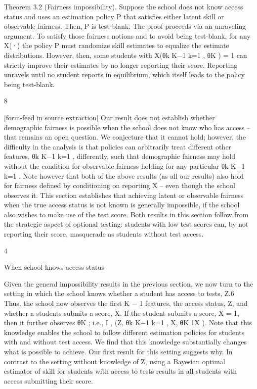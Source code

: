 \documentclass[10pt]{article}
\begin{document}
\begin{ReviewVerbatim}
Theorem 3.2 (Fairness impossibility). Suppose the school does not know access status and uses an
estimation policy P that satisfies either latent skill or observable fairness. Then, P is test-blank.
The proof proceeds via an unraveling argument. To satisfy those fairness notions and to avoid
being test-blank, for any X(·) the policy P must randomize skill estimates to equalize the estimate distributions. However, then, some students with X({θk }K−1
k=1 , θK ) = 1 can strictly improve
their estimates by no longer reporting their score. Reporting unravels until no student reports in
equilibrium, which itself leads to the policy being test-blank.

8


[form-feed in source extraction]
Our result does not establish whether demographic fairness is possible when the school does not
know who has access – that remains an open question. We conjecture that it cannot hold; however,
the diﬃculty in the analysis is that policies can arbitrarily treat diﬀerent other features, {θk }K−1
k=1 ,
diﬀerently, such that demographic fairness may hold without the condition for observable fairness
holding for any particular {θk }K−1
k=1 . Note however that both of the above results (as all our results)
also hold for fairness deﬁned by conditioning on reporting X – even though the school observes it.
This section establishes that achieving latent or observable fairness when the true access status
is not known is generally impossible, if the school also wishes to make use of the test score. Both
results in this section follow from the strategic aspect of optional testing: students with low test
scores can, by not reporting their score, masquerade as students without test access.

4

When school knows access status

Given the general impossibility results in the previous section, we now turn to the setting in which
the school knows whether a student has access to tests, Z.6 Thus, the school now observes the ﬁrst
K − 1 features, the access status, Z, and whether a students submits a score, X. If the student
submits a score, X = 1, then it further observes θK ; i.e., I , (Z, {θk }K−1
k=1 , X, θK 1X ). Note that this
knowledge enables the school to follow diﬀerent estimation policies for students with and without
test access. We ﬁnd that this knowledge substantially changes what is possible to achieve.
Our ﬁrst result for this setting suggests why. In contrast to the setting without knowledge of Z,
using a Bayesian optimal estimator of skill for students with access to tests results in all students
with access submitting their score.
\end{ReviewVerbatim}
\end{document}
